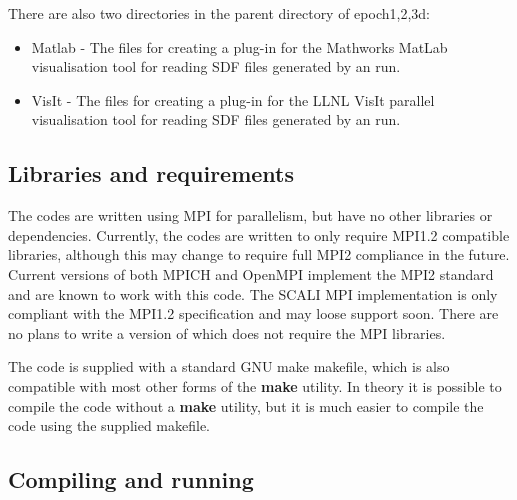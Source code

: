 There are also two directories in the parent directory of epoch{1,2,3}d:

\begin{itemize}
\item Matlab - The files for creating a plug-in for the Mathworks MatLab
  visualisation tool for reading SDF files generated by an {\EPOCH} run.
\item VisIt - The files for creating a plug-in for the LLNL VisIt parallel
  visualisation tool for reading SDF files generated by an {\EPOCH} run.
\end{itemize}

\subsection{Libraries and requirements}
The {\EPOCH} codes are written using MPI for parallelism, but have no other
libraries or dependencies. Currently, the codes are written to only require
MPI1.2 compatible libraries, although this may change to require full MPI2
compliance in the future. Current versions of both MPICH and OpenMPI implement
the MPI2 standard and are known to work with this code. The SCALI MPI
implementation is only compliant with the MPI1.2 specification and may loose
support soon.
There are no plans to write a version of {\EPOCH} which does not require
the MPI libraries.

The code is supplied with a standard GNU make makefile, which is also
compatible with most other forms of the {\bf make} utility. In theory it is
possible to compile the code without a {\bf make} utility, but it is much
easier to compile the code using the supplied makefile.

\subsection{Compiling and running {\EPOCH}}

